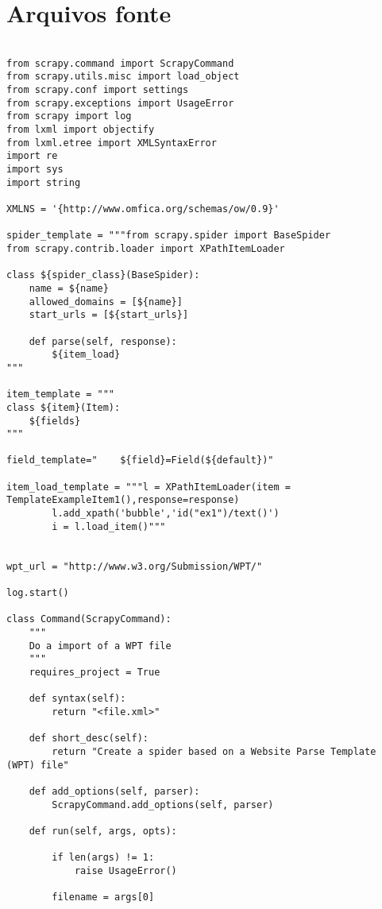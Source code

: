 \appendix
\chapter{Arquivos fonte}
\thispagestyle{fancy}

\begin{lstlisting}

from scrapy.command import ScrapyCommand
from scrapy.utils.misc import load_object
from scrapy.conf import settings
from scrapy.exceptions import UsageError
from scrapy import log
from lxml import objectify
from lxml.etree import XMLSyntaxError
import re
import sys
import string

XMLNS = '{http://www.omfica.org/schemas/ow/0.9}' 

spider_template = """from scrapy.spider import BaseSpider
from scrapy.contrib.loader import XPathItemLoader

class ${spider_class}(BaseSpider):
    name = ${name}
    allowed_domains = [${name}]
    start_urls = [${start_urls}]

    def parse(self, response):
        ${item_load}
"""

item_template = """
class ${item}(Item):
    ${fields}
"""

field_template="    ${field}=Field(${default})"

item_load_template = """l = XPathItemLoader(item = TemplateExampleItem1(),response=response)
        l.add_xpath('bubble','id("ex1")/text()') 
        i = l.load_item()"""


wpt_url = "http://www.w3.org/Submission/WPT/"

log.start()

class Command(ScrapyCommand):
    """
    Do a import of a WPT file 
    """
    requires_project = True

    def syntax(self):
        return "<file.xml>"

    def short_desc(self):
        return "Create a spider based on a Website Parse Template (WPT) file"

    def add_options(self, parser):
        ScrapyCommand.add_options(self, parser)

    def run(self, args, opts):

        if len(args) != 1:
            raise UsageError()

        filename = args[0]


\end{lstlisting}
